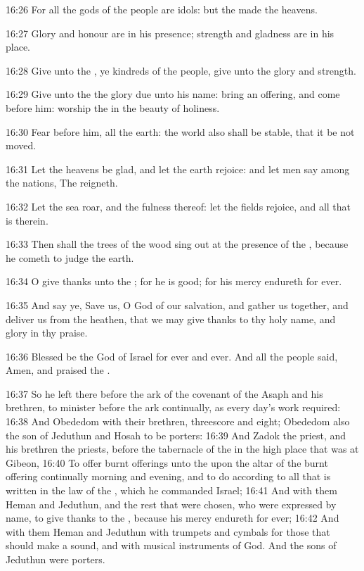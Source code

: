 16:26 For all the gods of the people are idols: but the \LORD made the
heavens.

16:27 Glory and honour are in his presence; strength and gladness are
in his place.

16:28 Give unto the \LORD, ye kindreds of the people, give unto the
\LORD glory and strength.

16:29 Give unto the \LORD the glory due unto his name: bring an
offering, and come before him: worship the \LORD in the beauty of
holiness.

16:30 Fear before him, all the earth: the world also shall be stable,
that it be not moved.

16:31 Let the heavens be glad, and let the earth rejoice: and let men
say among the nations, The \LORD reigneth.

16:32 Let the sea roar, and the fulness thereof: let the fields
rejoice, and all that is therein.

16:33 Then shall the trees of the wood sing out at the presence of the
\LORD, because he cometh to judge the earth.

16:34 O give thanks unto the \LORD; for he is good; for his mercy
endureth for ever.

16:35 And say ye, Save us, O God of our salvation, and gather us
together, and deliver us from the heathen, that we may give thanks to
thy holy name, and glory in thy praise.

16:36 Blessed be the \LORD God of Israel for ever and ever. And all the
people said, Amen, and praised the \LORD.

16:37 So he left there before the ark of the covenant of the \LORD
Asaph and his brethren, to minister before the ark continually, as
every day's work required: 16:38 And Obededom with their brethren,
threescore and eight; Obededom also the son of Jeduthun and Hosah to
be porters: 16:39 And Zadok the priest, and his brethren the priests,
before the tabernacle of the \LORD in the high place that was at
Gibeon, 16:40 To offer burnt offerings unto the \LORD upon the altar of
the burnt offering continually morning and evening, and to do
according to all that is written in the law of the \LORD, which he
commanded Israel; 16:41 And with them Heman and Jeduthun, and the rest
that were chosen, who were expressed by name, to give thanks to the
\LORD, because his mercy endureth for ever; 16:42 And with them Heman
and Jeduthun with trumpets and cymbals for those that should make a
sound, and with musical instruments of God. And the sons of Jeduthun
were porters.


